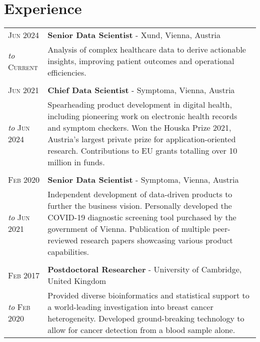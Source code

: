 \section{Experience}
\begin{tabular}{>{\raggedleft}p{2.15cm}|p{12cm}}

	\textsc{Jun 2024} &  \textbf{Senior Data Scientist} - Xund, Vienna, Austria \\
	\emph{to} \textsc{Current} & Analysis of complex healthcare data to derive actionable insights, improving patient outcomes and operational efficiencies. \\
	\multicolumn{2}{c}{}\\
	
	\textsc{Jun 2021} &  \textbf{Chief Data Scientist} - Symptoma, Vienna, Austria \\
	\emph{to} \textsc{Jun 2024} & Spearheading product development in digital health, including pioneering work on electronic health records and symptom checkers. Won the Houska Prize 2021, Austria's largest private prize for application-oriented research. Contributions to EU grants totalling over 10 million in funds. \\
	
	\multicolumn{2}{c}{}\\

    \textsc{Feb 2020} & \textbf{Senior Data Scientist} - Symptoma, Vienna, Austria \\
	\emph{to} \textsc{Jun 2021} & Independent development of data-driven products to further the business vision. Personally developed the COVID-19 diagnostic screening tool purchased by the government of Vienna. Publication of multiple peer-reviewed research papers showcasing various product capabilities. \\
	\multicolumn{2}{c}{}\\
	
	
    \textsc{Feb 2017} &  \textbf{Postdoctoral Researcher} - University of Cambridge, United Kingdom\\
	\emph{to} \textsc{Feb 2020} & Provided diverse bioinformatics and statistical support to a world-leading investigation into breast cancer heterogeneity. Developed ground-breaking technology to allow for cancer detection from a blood sample alone. \\
	
	
	

\end{tabular}
